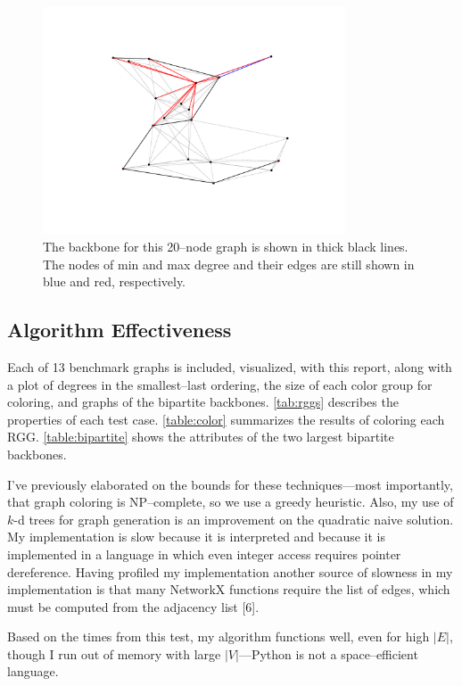 \documentclass[oneside, titlepage]{scrartcl}
\begin{document}
\begin{figure}[h!]
\centering
\includegraphics[width=0.8\textwidth]{figures/simplegraph100.pdf}
\caption{The backbone for this 20--node graph is shown in thick black lines. The nodes of min and max degree and their edges are still shown in blue and red, respectively.}
\end{figure}


\subsection{Algorithm Effectiveness}
Each of 13 benchmark graphs is included, visualized, with this report, along with a plot of degrees in the smallest--last ordering, the size of each color group for coloring, and graphs of the bipartite backbones. \autoref{tab:rggs} describes the properties of each test case. \autoref{table:color} summarizes the results of coloring each RGG. \autoref{table:bipartite} shows the attributes of the two largest bipartite backbones.

I've previously elaborated on the bounds for these techniques---most importantly, that graph coloring is NP--complete, so we use a greedy heuristic. Also, my use of $k$-d trees for graph generation is an improvement on the quadratic naive solution. My implementation is slow because it is interpreted and because it is implemented in a language in which even integer access requires pointer dereference. Having profiled my implementation another source of slowness in my implementation is that many NetworkX functions require the list of edges, which must be computed from the adjacency list [6].

Based on the times from this test, my algorithm functions well, even for high $|E|$, though I run out of memory with large $|V|$---Python is not a space--efficient language.
\end{document}
